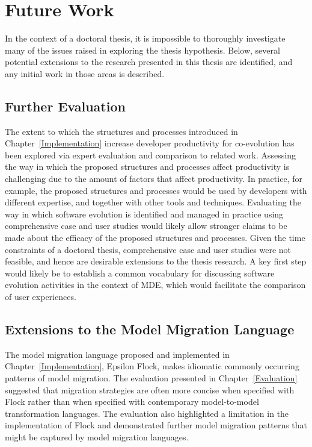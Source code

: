 
\section{Future Work}
\label{sec:future_work}
In the context of a doctoral thesis, it is impossible to thoroughly investigate many of the issues raised in exploring the thesis hypothesis. Below, several potential extensions to the research presented in this thesis are identified, and any initial work in those areas is described. 

\subsection{Further Evaluation}
The extent to which the structures and processes introduced in Chapter~\ref{Implementation} increase developer productivity for co-evolution has been explored via expert evaluation and comparison to related work. Assessing the way in which the proposed structures and processes affect productivity is challenging due to the amount of factors that affect productivity. In practice, for example, the proposed structures and processes would be used by developers with different expertise, and together with other tools and techniques. Evaluating the way in which software evolution is identified and managed in practice using comprehensive case and user studies would likely allow stronger claims to be made about the efficacy of the proposed structures and processes. Given the time constraints of a doctoral thesis, comprehensive case and user studies were not feasible, and hence are desirable extensions to the thesis research. A key first step would likely be to establish a common vocabulary for discussing software evolution activities in the context of MDE, which would facilitate the comparison of user experiences.

\subsection{Extensions to the Model Migration Language}
The model migration language proposed and implemented in Chapter~\ref{Implementation}, Epsilon Flock, makes idiomatic commonly occurring patterns of model migration. The evaluation presented in Chapter~\ref{Evaluation} suggested that migration strategies are often more concise when specified with Flock rather than when specified with contemporary model-to-model transformation languages. The evaluation also highlighted a limitation in the implementation of Flock and demonstrated further model migration patterns that might be captured by model migration languages.


